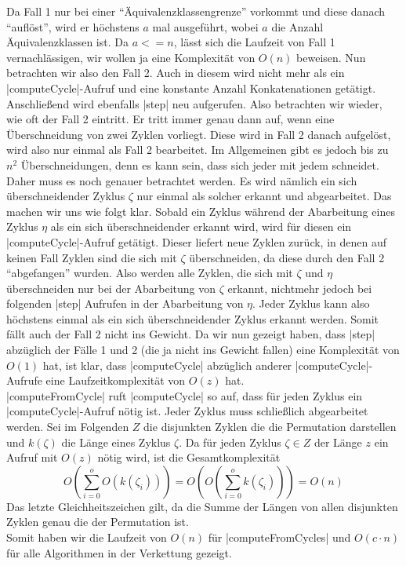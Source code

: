 Da Fall 1 nur bei einer ``Äquivalenzklassengrenze'' vorkommt und diese danach ``auflöst'', wird er höchstens $a$ mal ausgeführt, wobei $a$ die Anzahl Äquivalenzklassen ist.
Da $a <= n$, lässt sich die Laufzeit von Fall 1 vernachlässigen, wir wollen ja eine Komplexität von $O(n)$ beweisen.
Nun betrachten wir also den Fall 2. Auch in diesem wird nicht mehr als ein |computeCycle|-Aufruf und eine konstante Anzahl Konkatenationen getätigt.
Anschließend wird ebenfalls |step| neu aufgerufen. Also betrachten wir wieder, wie oft der Fall 2 eintritt.
Er tritt immer genau dann auf, wenn eine Überschneidung von zwei Zyklen vorliegt. Diese wird in Fall 2 danach aufgelöst, wird also nur einmal als Fall 2 bearbeitet.
Im Allgemeinen gibt es jedoch bis zu $n^2$ Überschneidungen, denn es kann sein, dass sich jeder mit jedem schneidet. Daher muss es noch genauer betrachtet werden.
Es wird nämlich ein sich überschneidender Zyklus $\zeta$ nur einmal als solcher erkannt und abgearbeitet. Das machen wir uns wie folgt klar.
Sobald ein Zyklus während der Abarbeitung eines Zyklus $\eta$ als ein sich überschneidender erkannt wird, wird für diesen ein |computeCycle|-Aufruf getätigt.
Dieser liefert neue Zyklen zurück, in denen auf keinen Fall Zyklen sind die sich mit $\zeta$ überschneiden, da diese durch den Fall 2 ``abgefangen'' wurden.
Also werden alle Zyklen, die sich mit $\zeta$ und $\eta$ überschneiden nur bei der Abarbeitung von $\zeta$ erkannt, nichtmehr jedoch bei folgenden |step| Aufrufen
in der Abarbeitung von $\eta$. Jeder Zyklus kann also höchstens einmal als ein sich überschneidender Zyklus erkannt werden. Somit fällt auch der Fall 2 nicht ins Gewicht.
Da wir nun gezeigt haben, dass |step| abzüglich der Fälle 1 und 2 (die ja nicht ins Gewicht fallen) eine Komplexität von $O(1)$ hat, ist klar, dass
|computeCycle| abzüglich anderer |computeCycle|-Aufrufe eine Laufzeitkomplexität von $O(z)$ hat.\\
|computeFromCycle| ruft |computeCycle| so auf, dass für jeden Zyklus ein |computeCycle|-Aufruf nötig ist. Jeder Zyklus muss schließlich abgearbeitet werden.
Sei im Folgenden $Z$ die disjunkten Zyklen die die Permutation darstellen und $k(\zeta)$ die Länge eines Zyklus $\zeta$.
Da für jeden Zyklus $\zeta \in Z$ der Länge $z$ ein Aufruf mit $O(z)$ nötig wird, ist die Gesamtkomplexität
\[O(\sum_{i=0}^{o}{O(k(\zeta_i))})=O(O(\sum_{i=0}^{o}{k(\zeta_i)}))=O(n)\]
Das letzte Gleichheitszeichen gilt, da die Summe der Längen von allen disjunkten Zyklen genau die der Permutation ist.\\
Somit haben wir die Laufzeit von $O(n)$ für |computeFromCycles| und $O(c \cdot n)$ für alle Algorithmen in der Verkettung gezeigt.

